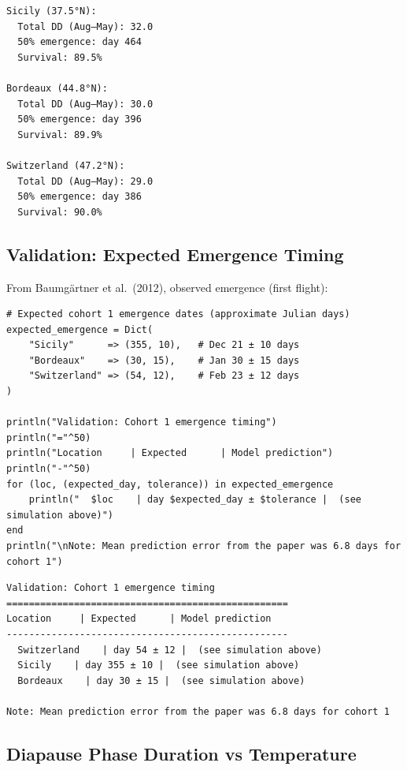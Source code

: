 \begin{verbatim}
Sicily (37.5°N):
  Total DD (Aug–May): 32.0
  50% emergence: day 464
  Survival: 89.5%

Bordeaux (44.8°N):
  Total DD (Aug–May): 30.0
  50% emergence: day 396
  Survival: 89.9%

Switzerland (47.2°N):
  Total DD (Aug–May): 29.0
  50% emergence: day 386
  Survival: 90.0%
\end{verbatim}



\subsection{Validation: Expected Emergence Timing}



\label{2611853700746871542}{}


From Baumgärtner et al.~(2012), observed emergence (first flight):




\begin{verbatim}
# Expected cohort 1 emergence dates (approximate Julian days)
expected_emergence = Dict(
    "Sicily"      => (355, 10),   # Dec 21 ± 10 days
    "Bordeaux"    => (30, 15),    # Jan 30 ± 15 days
    "Switzerland" => (54, 12),    # Feb 23 ± 12 days
)

println("Validation: Cohort 1 emergence timing")
println("="^50)
println("Location     | Expected      | Model prediction")
println("-"^50)
for (loc, (expected_day, tolerance)) in expected_emergence
    println("  $loc    | day $expected_day ± $tolerance |  (see simulation above)")
end
println("\nNote: Mean prediction error from the paper was 6.8 days for cohort 1")
\end{verbatim}




\begin{verbatim}
Validation: Cohort 1 emergence timing
==================================================
Location     | Expected      | Model prediction
--------------------------------------------------
  Switzerland    | day 54 ± 12 |  (see simulation above)
  Sicily    | day 355 ± 10 |  (see simulation above)
  Bordeaux    | day 30 ± 15 |  (see simulation above)

Note: Mean prediction error from the paper was 6.8 days for cohort 1
\end{verbatim}



\subsection{Diapause Phase Duration vs Temperature}



